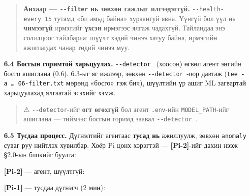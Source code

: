 \begin{quote}
\textbf{Анхаар --- \texttt{-\/-filter} нь зөвхөн гажлыг илгээдэггүй.} \texttt{-\/\allowbreak{}-health-every\ 15} тутамд «би амьд байна» хураангуй явна. Үүнгүй бол үүл нь \textbf{чимээгүй} ирмэгийг \textbf{үхсэн} ирмэгээс ялгаж чадахгүй. Тайландаа энэ солилцоог тайлбарла: шүүлт хэдий чинээ хатуу байна, ирмэгийн ажиглагдах чанар төдий чинээ муу.
\end{quote}

\textbf{6.4 Босгын горимтой харьцуулах.} \texttt{-\/-detector\ \textquotesingle{}\textquotesingle{}} (хоосон) өгвөл агент энгийн босго ашиглана (0.6). 6.3-ыг яг ижлээр, зөвхөн \texttt{-\/-detector\ \textquotesingle{}\textquotesingle{}}-оор давтаж (\texttt{tee\ -a\ \ldots{}\ 06-filter.\allowbreak{}txt} мөрөнд «босго» гэж бич), шүүлтийн үр ашиг ML загвартай харьцуулахад ялгаатай эсэхийг хэмж.

\begin{quote}
⚠ \texttt{-\/-detector}-ийг \textbf{огт өгөхгүй} бол агент \texttt{.env}-ийн \texttt{MODEL\_PATH}-ийг ашиглана --- тиймээс босгын горимд заавал \texttt{-\/-detector\ \textquotesingle{}\textquotesingle{}}.
\end{quote}

\textbf{6.5 Тусдаа процесс.} Дүгнэлтийг агентаас \textbf{тусад нь} ажиллуулж, зөвхөн \texttt{anomaly} суваг руу нийтлэх хувилбар. Хоёр Pi цонх хэрэгтэй --- \textbf{{[}Pi-2{]}}-ийг дахин нээж §2.0-ын блокийг буулга:

\textbf{{[}Pi-2{]}} --- агент, шүүлтгүй:

\begin{Shaded}
\begin{Highlighting}[]
\KeywordTok{\&\&}  \StringTok{\textquotesingle{}\textquotesingle{}}
\end{Highlighting}
\end{Shaded}

\textbf{{[}Pi-1{]}} --- тусдаа дүгнэгч (2 мин):

\begin{Shaded}
\begin{Highlighting}[]
 \KeywordTok{\textbackslash{}}
\end{Highlighting}
\end{Shaded}

